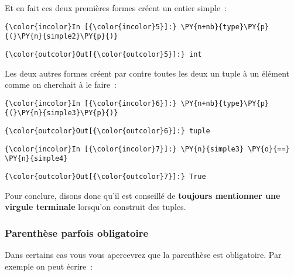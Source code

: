 Et en fait ces deux premières formes créent un entier simple~:

    \begin{Verbatim}[commandchars=\\\{\}]
{\color{incolor}In [{\color{incolor}5}]:} \PY{n+nb}{type}\PY{p}{(}\PY{n}{simple2}\PY{p}{)}
\end{Verbatim}


\begin{Verbatim}[commandchars=\\\{\}]
{\color{outcolor}Out[{\color{outcolor}5}]:} int
\end{Verbatim}
            
    Les deux autres formes créent par contre toutes les deux un tuple à un
élément comme on cherchait à le faire~:

    \begin{Verbatim}[commandchars=\\\{\}]
{\color{incolor}In [{\color{incolor}6}]:} \PY{n+nb}{type}\PY{p}{(}\PY{n}{simple3}\PY{p}{)}
\end{Verbatim}


\begin{Verbatim}[commandchars=\\\{\}]
{\color{outcolor}Out[{\color{outcolor}6}]:} tuple
\end{Verbatim}
            
    \begin{Verbatim}[commandchars=\\\{\}]
{\color{incolor}In [{\color{incolor}7}]:} \PY{n}{simple3} \PY{o}{==} \PY{n}{simple4}
\end{Verbatim}


\begin{Verbatim}[commandchars=\\\{\}]
{\color{outcolor}Out[{\color{outcolor}7}]:} True
\end{Verbatim}
            
    Pour conclure, disons donc qu'il est conseillé de \textbf{toujours
mentionner une virgule terminale} lorsqu'on construit des tuples.

    \hypertarget{parenthuxe8se-parfois-obligatoire}{%
\subsubsection{Parenthèse parfois
obligatoire}\label{parenthuxe8se-parfois-obligatoire}}

    Dans certains cas vous vous apercevrez que la parenthèse est
obligatoire. Par exemple on peut écrire~:

